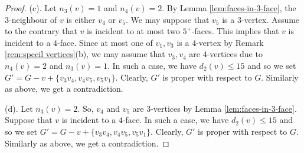 \documentclass[12pt, reqno]{amsart}
\theoremstyle{plain}
\theoremstyle{definition}
\numberwithin{equation}{section}
\begin{document}
\begin{proof}
(c).  Let $n_3(v)=1$ and $n_4(v)=2$. By Lemma \ref{lem:faces-in-3-face}, the $3$-neighbour of $v$ is either $v_4$ or $v_5$. We may suppose that $v_5$ is a $3$-vertex. Assume to the contrary that $v$ is incident to at most two $5^+$-faces. This implies that $v$ is incident to a $4$-face. Since at most one of $v_1,v_3$ is a $4$-vertex by Remark \ref{rem:specil vertices}(b), we may assume that $v_3,v_4$ are $4$-vertices due to $n_4(v)= 2$ and $n_3(v)=1$.  In such a case, we have $d_2(v)\leq 15$ and so we set $G'=G-v+\{v_3v_4,v_4v_5,v_5v_1\}$.  Clearly,  $G'$ is proper with respect to $G$.
Similarly as above, we get a contradiction. 


(d). Let $n_3(v)=2$. So, $v_4$ and $v_5$ are $3$-vertices by Lemma \ref{lem:faces-in-3-face}.  Suppose that $v$ is incident to a $4$-face.  In such a case, we have $d_2(v)\leq 15$ and so we set $G'=G-v+\{v_3v_4,v_4v_5,v_5v_1\}$.  Clearly,  $G'$ is proper with respect to $G$.
Similarly as above, we get a contradiction. 
\end{proof}
\end{document}
